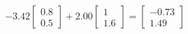 \documentclass[preview]{standalone}
\begin{document}
\begin{align*}
-3.42 \begin{bmatrix} 0.8 \\ 0.5 \end{bmatrix} + 2.00 \begin{bmatrix} 1 \\ 1.6 \end{bmatrix} = \begin{bmatrix} -0.73 \\ 1.49 \end{bmatrix}
\end{align*}
\end{document}

